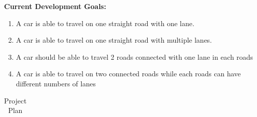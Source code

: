 \documentclass[a4paper,11pt]{article}
\begin{document}
\textbf{Current Development Goals:}
\begin{enumerate}
	\item A car is able to travel on one straight road with one lane.
	\item A car is able to travel on one straight road with multiple lanes.
	\item A car should be able to travel 2 roads connected with one lane in each roads
	\item A car is able to travel on two connected roads while each roads can have different numbers of lanes
\end{enumerate}

\begin{table}[ht]
	\caption{Project Plan}
	\begin{adjustwidth}{-2cm}{}
	 \footnotesize
		
		\begin{tabular}{|m{0.8cm}|m{6cm}|m{2.3cm}|m{1.3cm}|m{1.3cm}|c|m{2.6cm}|m{0.5cm}|}\hline
			

\end{tabular}
\end{adjustwidth}
\end{table}
\end{document}
